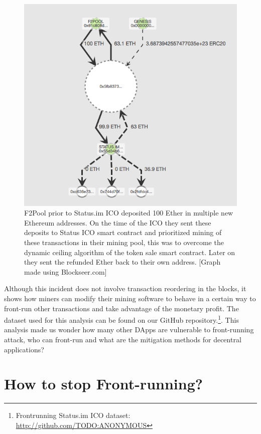 \begin{figure}[h]
\centering
\includegraphics[width=0.7\linewidth]{figures/F2Pool_transactions_to_StatusICO_and_Refunds.png}
\caption{F2Pool prior to Status.im ICO deposited 100 Ether in multiple new Ethereum addresses. On the time of the ICO they sent these deposits to Status ICO smart contract and prioritized mining of these transactions in their mining pool, this was to overcome the dynamic ceiling algorithm of the token sale smart contract. Later on they sent the refunded Ether back to their own address. [Graph made using Blockseer.com] \label{fig:f2poolfront-run}}
\end{figure}


Although this incident does not involve transaction reordering in the blocks, it shows how miners can modify their mining software to behave in a certain way to front-run other transactions and take advantage of the monetary profit. The dataset used for this analysis can be found on our GitHub repository.\footnote{Frontrunning Status.im ICO dataset: \url{http://github.com/TODO:ANONYMOUS}}. This analysis made us wonder how many other DApps are vulnerable to front-running attack, who can front-run and what are the mitigation methods for decentral applications?



\section{How to stop Front-running?} %

